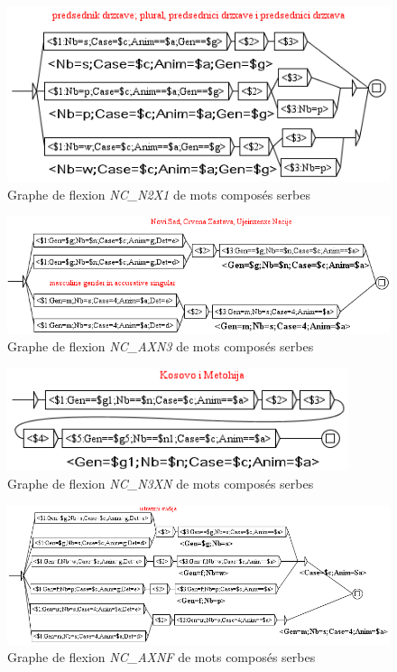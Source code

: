 \begin{figure}[!htb]
  \centering
  \includegraphics[width=12.2cm]{resources/img/NC'N2X1'SRB.png}
  \caption{Graphe de flexion \emph{NC\_N2X1} de mots composés serbes}
  \label{fig:NC'N2X1'SRB}
\end{figure}

\begin{figure}[!htb]
  \centering
  \includegraphics[width=15cm]{resources/img/NC'AXN3'SRB.png}
  \caption{Graphe de flexion \emph{NC\_AXN3} de mots composés serbes}
  \label{fig:NC'AXN3'SRB}
\end{figure}

\begin{figure}[!htb]
  \centering
  \includegraphics[width=10cm]{resources/img/NC'N3XN'SRB.png}
  \caption{Graphe de flexion \emph{NC\_N3XN} de mots composés serbes}
  \label{fig:NC'N3XN'SRB}
\end{figure}

\begin{figure}[!htb]
  \centering
  \includegraphics[width=15cm]{resources/img/NC'AXNF'SRB.png}
  \caption{Graphe de flexion \emph{NC\_AXNF} de mots composés serbes}
  \label{fig:NC'AXNF'SRB}
\end{figure}

